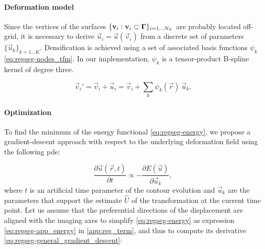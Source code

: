 \paragraph*{Deformation model}\label{sec:regseg-deformation_model}
Since the vertices of the surfaces $\{\mathbf{v}_i: \mathbf{v}_i \subset \boldsymbol{\Gamma} \}_{i=1 \ldots N_V}$
  are probably located off-grid, it is necessary to derive $\vec{u}_i = \vec{u}(\vec{v}_i)$ from a discrete set of parameters
  $\{\vec{u}_k\}_{k=1 \ldots K}$.
Densification is achieved using a set of associated basis functions $\psi_k$ \eqref{eq:regseg-nodes_tfm}.
In our implementation, $\psi_k$ is a tensor-product B-spline kernel of degree three.

  \begin{equation}
  \vec{v}_i' = \vec{v}_i + \vec{u}_i = \vec{v}_i + \sum_k \psi_k(\vec{r}) \: \vec{u}_k.
  \label{eq:regseg-nodes_tfm}
  \end{equation}


\paragraph*{Optimization}
\label{sec:regseg-gradient_descent}
To find the minimum of the energy functional \eqref{eq:regseg-energy},
  we propose a gradient-descent approach with respect to the underlying
  deformation field using the following \gls*{pde}:

  \begin{equation}
  \frac{\partial \vec{u}(\vec{r},t)}{\partial t} \propto - \frac{\partial E(\vec{u})}{\partial \vec{u}_k},
  \label{eq:regseg-general_gradient_descent}
  \end{equation}
  where $t$ is an artificial time parameter of the contour
  evolution and $\vec{u}_k$ are the parameters that support the estimate
  $\hat{U}$ of the transformation at the current time point.
Let us assume that the preferential directions of
  the displacement are aligned with the imaging axes to simplify \eqref{eq:regseg-energy} as expression 
  \eqref{eq:regseg-app_energy} in \ref{app:reg_term}, and thus to compute its
  derivative \eqref{eq:regseg-general_gradient_descent}:

